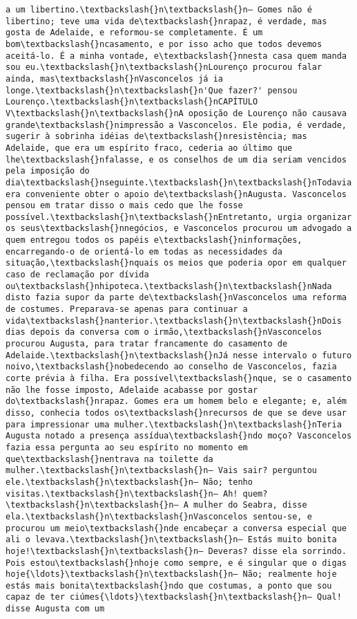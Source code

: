 \documentclass[11pt]{article}
\begin{document}
\begin{Verbatim}[commandchars=\\\{\}]
a um libertino.\textbackslash{}n\textbackslash{}n— Gomes não é libertino; teve uma vida de\textbackslash{}nrapaz, é verdade, mas gosta de Adelaide, e reformou-se completamente. É um bom\textbackslash{}ncasamento, e por isso acho que todos devemos aceitá-lo. É a minha vontade, e\textbackslash{}nnesta casa quem manda sou eu.\textbackslash{}n\textbackslash{}nLourenço procurou falar ainda, mas\textbackslash{}nVasconcelos já ia longe.\textbackslash{}n\textbackslash{}n'Que fazer?' pensou Lourenço.\textbackslash{}n\textbackslash{}nCAPÍTULO V\textbackslash{}n\textbackslash{}nA oposição de Lourenço não causava grande\textbackslash{}nimpressão a Vasconcelos. Ele podia, é verdade, sugerir à sobrinha idéias de\textbackslash{}nresistência; mas Adelaide, que era um espírito fraco, cederia ao último que lhe\textbackslash{}nfalasse, e os conselhos de um dia seriam vencidos pela imposição do dia\textbackslash{}nseguinte.\textbackslash{}n\textbackslash{}nTodavia era conveniente obter o apoio de\textbackslash{}nAugusta. Vasconcelos pensou em tratar disso o mais cedo que lhe fosse possível.\textbackslash{}n\textbackslash{}nEntretanto, urgia organizar os seus\textbackslash{}nnegócios, e Vasconcelos procurou um advogado a quem entregou todos os papéis e\textbackslash{}ninformações, encarregando-o de orientá-lo em todas as necessidades da situação,\textbackslash{}nquais os meios que poderia opor em qualquer caso de reclamação por dívida ou\textbackslash{}nhipoteca.\textbackslash{}n\textbackslash{}nNada disto fazia supor da parte de\textbackslash{}nVasconcelos uma reforma de costumes. Preparava-se apenas para continuar a vida\textbackslash{}nanterior.\textbackslash{}n\textbackslash{}nDois dias depois da conversa com o irmão,\textbackslash{}nVasconcelos procurou Augusta, para tratar francamente do casamento de Adelaide.\textbackslash{}n\textbackslash{}nJá nesse intervalo o futuro noivo,\textbackslash{}nobedecendo ao conselho de Vasconcelos, fazia corte prévia à filha. Era possível\textbackslash{}nque, se o casamento não lhe fosse imposto, Adelaide acabasse por gostar do\textbackslash{}nrapaz. Gomes era um homem belo e elegante; e, além disso, conhecia todos os\textbackslash{}nrecursos de que se deve usar para impressionar uma mulher.\textbackslash{}n\textbackslash{}nTeria Augusta notado a presença assídua\textbackslash{}ndo moço? Vasconcelos fazia essa pergunta ao seu espírito no momento em que\textbackslash{}nentrava na toilette da mulher.\textbackslash{}n\textbackslash{}n— Vais sair? perguntou ele.\textbackslash{}n\textbackslash{}n— Não; tenho visitas.\textbackslash{}n\textbackslash{}n— Ah! quem?\textbackslash{}n\textbackslash{}n— A mulher do Seabra, disse ela.\textbackslash{}n\textbackslash{}nVasconcelos sentou-se, e procurou um meio\textbackslash{}nde encabeçar a conversa especial que ali o levava.\textbackslash{}n\textbackslash{}n— Estás muito bonita hoje!\textbackslash{}n\textbackslash{}n— Deveras? disse ela sorrindo. Pois estou\textbackslash{}nhoje como sempre, e é singular que o digas hoje{\ldots}\textbackslash{}n\textbackslash{}n— Não; realmente hoje estás mais bonita\textbackslash{}ndo que costumas, a ponto que sou capaz de ter ciúmes{\ldots}\textbackslash{}n\textbackslash{}n— Qual! disse Augusta com um 
\end{Verbatim}
\end{document}
